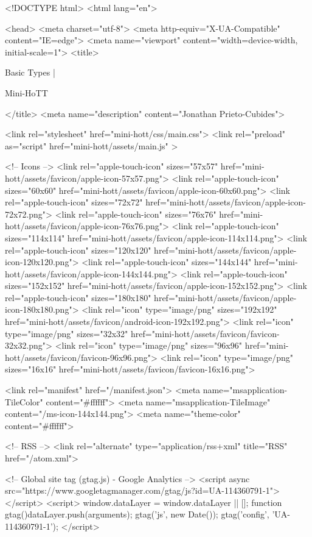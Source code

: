 <!DOCTYPE html>
<html lang="en">

<head>
  <meta charset="utf-8">
  <meta http-equiv="X-UA-Compatible" content="IE=edge">
  <meta name="viewport" content="width=device-width, initial-scale=1">
  <title>
    
      
        Basic Types |
      
        Mini-HoTT
    
  </title>
  <meta name="description" content="Jonathan Prieto-Cubides">

  <link rel="stylesheet" href="mini-hott/css/main.css">
  <link rel="preload" as="script" href="mini-hott/assets/main.js" >

  <!-- Icons -->
  <link rel="apple-touch-icon" sizes="57x57" href="mini-hott/assets/favicon/apple-icon-57x57.png">
  <link rel="apple-touch-icon" sizes="60x60" href="mini-hott/assets/favicon/apple-icon-60x60.png">
  <link rel="apple-touch-icon" sizes="72x72" href="mini-hott/assets/favicon/apple-icon-72x72.png">
  <link rel="apple-touch-icon" sizes="76x76" href="mini-hott/assets/favicon/apple-icon-76x76.png">
  <link rel="apple-touch-icon" sizes="114x114" href="mini-hott/assets/favicon/apple-icon-114x114.png">
  <link rel="apple-touch-icon" sizes="120x120" href="mini-hott/assets/favicon/apple-icon-120x120.png">
  <link rel="apple-touch-icon" sizes="144x144" href="mini-hott/assets/favicon/apple-icon-144x144.png">
  <link rel="apple-touch-icon" sizes="152x152" href="mini-hott/assets/favicon/apple-icon-152x152.png">
  <link rel="apple-touch-icon" sizes="180x180" href="mini-hott/assets/favicon/apple-icon-180x180.png">
  <link rel="icon" type="image/png" sizes="192x192"  href="mini-hott/assets/favicon/android-icon-192x192.png">
  <link rel="icon" type="image/png" sizes="32x32" href="mini-hott/assets/favicon/favicon-32x32.png">
  <link rel="icon" type="image/png" sizes="96x96" href="mini-hott/assets/favicon/favicon-96x96.png">
  <link rel="icon" type="image/png" sizes="16x16" href="mini-hott/assets/favicon/favicon-16x16.png">

  <link rel="manifest" href="/manifest.json">
  <meta name="msapplication-TileColor" content="#ffffff">
  <meta name="msapplication-TileImage" content="/ms-icon-144x144.png">
  <meta name="theme-color" content="#ffffff">

  <!-- RSS -->
  <link rel="alternate" type="application/rss+xml" title="RSS" href="/atom.xml">

  <!-- Global site tag (gtag.js) - Google Analytics -->
  <script async src="https://www.googletagmanager.com/gtag/js?id=UA-114360791-1"></script>
  <script>
    window.dataLayer = window.dataLayer || [];
    function gtag(){dataLayer.push(arguments);}
    gtag('js', new Date());
    gtag('config', 'UA-114360791-1');
  </script>

